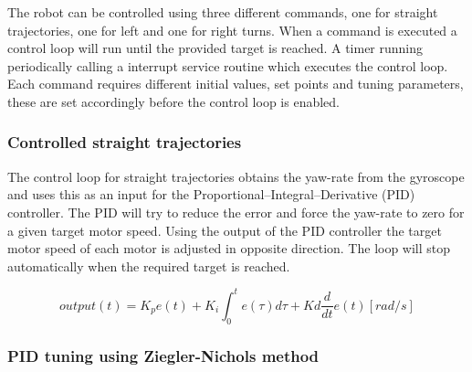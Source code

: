 The robot can be controlled using three different commands, one for straight trajectories, one for left and one for right turns.
When a command is executed a control loop will run until the provided target is reached.
A timer running periodically calling a interrupt service routine which executes the control loop.   
Each command requires different initial values, set points and tuning parameters, these are set accordingly before the control loop is enabled.

\subsubsection{Controlled straight trajectories}


The control loop for straight trajectories obtains the yaw-rate from the gyroscope and uses this as an input for the Proportional–Integral–Derivative (PID) controller.
The PID will try to reduce the error and force the yaw-rate to zero for a given target motor speed.
Using the output of the PID controller the target motor speed of each motor is adjusted in opposite direction.
The loop will stop automatically when the required target is reached.

\begin{equation}
output(t) = K_{p}e(t) + K_{i} \int_{0}^{t}e(\tau)d\tau + Kd\frac{d}{dt}e(t) [rad/s]
\end{equation}

\subsubsection{PID tuning using Ziegler-Nichols method}



